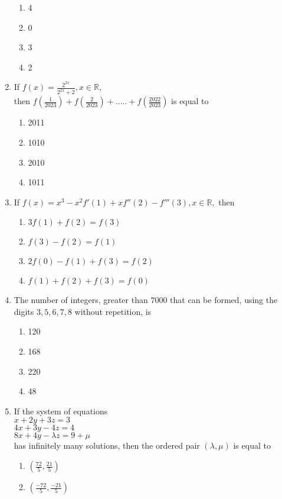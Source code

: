 \documentclass[journal]{IEEEtran}
\begin{document}
\begin{enumerate}
\begin{enumerate}
    \item 4
    \item 0
    \item 3
    \item 2
    \end{enumerate}
    \item If $f(x)=\frac{2^{2x}}{2^{2x}+2}, x \in \mathbb{R}$, \\
    then $f\left( \frac{1}{2023} \right)+f\left( \frac{2}{2023} \right)+.....+f\left( \frac{2022}{2023} \right)$ is equal to
    \begin{enumerate}
        \item 2011
        \item 1010
        \item 2010
        \item 1011
    \end{enumerate}
    \item If $ f(x)=x^{3}-x^{2}f'(1)+xf''(2)-f'''(3), x \in \mathbb{R}, $ then 
    \begin{enumerate}
        \item $ 3f(1) + f(2) = f(3) $
        \item $ f(3)-f(2) = f(1) $
        \item $ 2f(0)-f(1) + f(3) = f(2) $
        \item $ f(1) + f(2) + f(3) = f(0) $
    \end{enumerate}
    \item The number of integers, greater than $7000$ that can
be formed, using the digits $3, 5, 6, 7, 8$ without
repetition, is
\begin{enumerate}
    \item 120
    \item 168
    \item 220
    \item 48
\end{enumerate}
    \item If the system of equations \\
 $ x + 2y + 3z = 3$ \\
$ 4x + 3y-4z = 4$ \\
 $8x + 4y-\lambda z = 9 + \mu $ \\ 
 has infinitely many solutions, then the ordered pair
$(\lambda, \mu)$ is equal to
\begin{enumerate}
    \item $ \left( \frac{72}{5},\frac{21}{5} \right)$
    \item $ \left( \frac{-72}{5},\frac{-21}{5} \right)$

\end{enumerate}
\end{enumerate}
\end{document}
